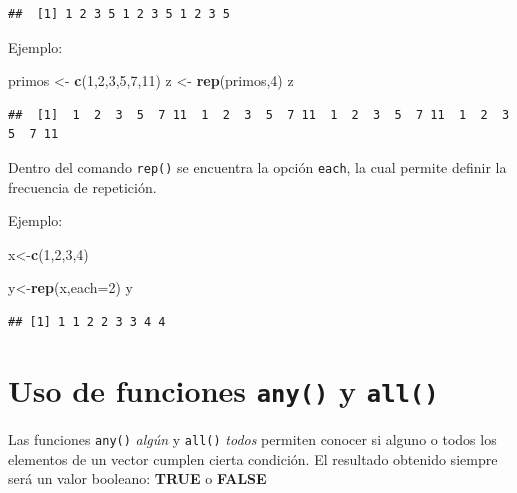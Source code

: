 \documentclass[
]{book}
\newenvironment{Shaded}{\begin{snugshade}}{\end{snugshade}}
\newcommand{\AttributeTok}[1]{\textcolor[rgb]{0.13,0.29,0.53}{#1}}
\newcommand{\DecValTok}[1]{\textcolor[rgb]{0.00,0.00,0.81}{#1}}
\newcommand{\FunctionTok}[1]{\textcolor[rgb]{0.13,0.29,0.53}{\textbf{#1}}}
\newcommand{\NormalTok}[1]{#1}
\newcommand{\OtherTok}[1]{\textcolor[rgb]{0.56,0.35,0.01}{#1}}
\begin{document}
\begin{verbatim}
##  [1] 1 2 3 5 1 2 3 5 1 2 3 5
\end{verbatim}

Ejemplo:

\begin{Shaded}
\begin{Highlighting}[]
\NormalTok{primos }\OtherTok{\textless{}{-}} \FunctionTok{c}\NormalTok{(}\DecValTok{1}\NormalTok{,}\DecValTok{2}\NormalTok{,}\DecValTok{3}\NormalTok{,}\DecValTok{5}\NormalTok{,}\DecValTok{7}\NormalTok{,}\DecValTok{11}\NormalTok{)}
\NormalTok{z }\OtherTok{\textless{}{-}} \FunctionTok{rep}\NormalTok{(primos,}\DecValTok{4}\NormalTok{)}
\NormalTok{z}
\end{Highlighting}
\end{Shaded}

\begin{verbatim}
##  [1]  1  2  3  5  7 11  1  2  3  5  7 11  1  2  3  5  7 11  1  2  3  5  7 11
\end{verbatim}

Dentro del comando \texttt{rep()} se encuentra la opción \texttt{each}, la cual permite definir la frecuencia de repetición.

Ejemplo:

\begin{Shaded}
\begin{Highlighting}[]
\NormalTok{x}\OtherTok{\textless{}{-}}\FunctionTok{c}\NormalTok{(}\DecValTok{1}\NormalTok{,}\DecValTok{2}\NormalTok{,}\DecValTok{3}\NormalTok{,}\DecValTok{4}\NormalTok{)}

\NormalTok{y}\OtherTok{\textless{}{-}}\FunctionTok{rep}\NormalTok{(x,}\AttributeTok{each=}\DecValTok{2}\NormalTok{)}
\NormalTok{y}
\end{Highlighting}
\end{Shaded}

\begin{verbatim}
## [1] 1 1 2 2 3 3 4 4
\end{verbatim}

\hypertarget{uso-de-funciones-any-y-all}{%
\section{\texorpdfstring{Uso de funciones \texttt{any()} y \texttt{all()}}{Uso de funciones any() y all()}}\label{uso-de-funciones-any-y-all}}

Las funciones \texttt{any()} \emph{algún} y \texttt{all()} \emph{todos} permiten conocer si alguno o todos los elementos de un vector cumplen cierta condición.
El resultado obtenido siempre será un valor booleano: \textbf{TRUE} o \textbf{FALSE}
\end{document}
